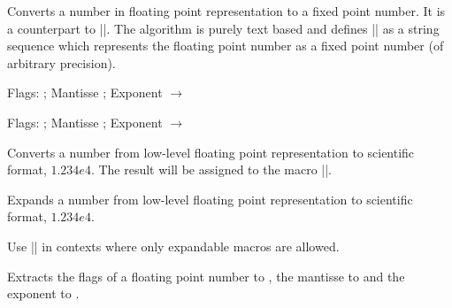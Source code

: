 \begin{command}{}
	Converts a number in floating point representation to a fixed point number. It is a counterpart to |\pgfmathfloatparsenumber|. The algorithm is purely text based and defines |\pgfmathresult| as a string sequence which represents the floating point number  as a fixed point number (of arbitrary precision).

\begin{codeexample}[]
\pgfmathfloattomacro{\pgfmathresult}{\F}{\M}{\E}
Flags: \F; Mantisse \M; Exponent \E
$\to$ 
\pgfmathfloattofixed{\pgfmathresult}
\pgfmathresult
\end{codeexample}

\begin{codeexample}[]
\pgfmathfloattomacro{\pgfmathresult}{\F}{\M}{\E}
Flags: \F; Mantisse \M; Exponent \E
$\to$
\pgfmathfloattofixed{\pgfmathresult}
\pgfmathresult 
\end{codeexample}
\end{command}

\begin{command}{\pgfmathfloattosci{}}
	Converts a number from low-level floating point representation to scientific format, $1.234e4$. The result will be assigned to the macro |\pgfmathresult|.
\end{command}
\begin{command}{\pgfmathfloatvalueof{}}
	Expands a number from low-level floating point representation to scientific format, $1.234e4$.

	Use |\pgfmathfloatvalueof| in contexts where only expandable macros are allowed.
\end{command}


\begin{command}{}
	Extracts the flags of a floating point number  to , the mantisse to  and the exponent to .
\end{command}

